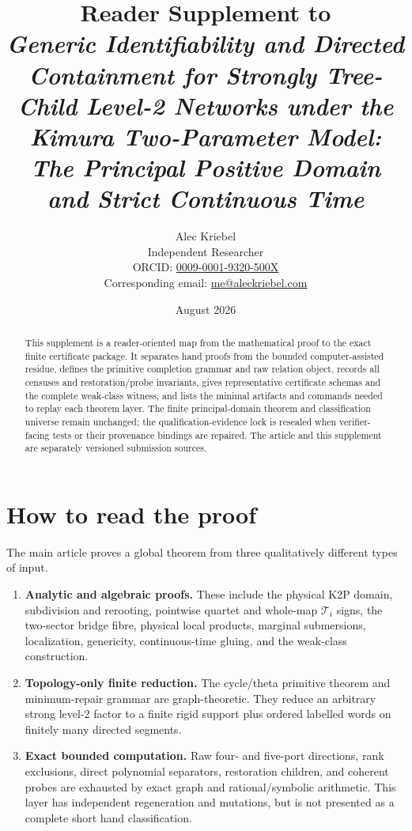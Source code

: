 \documentclass[11pt]{article}
\title{Reader Supplement to\\
\emph{Generic Identifiability and Directed Containment for Strongly
Tree-Child Level-2 Networks under the Kimura Two-Parameter Model:\\
The Principal Positive Domain and Strict Continuous Time}}
\author{Alec Kriebel\\
\small Independent Researcher\\
\small ORCID: \href{https://orcid.org/0009-0001-9320-500X}
{0009-0001-9320-500X}\\
\small Corresponding email: \href{mailto:me@aleckriebel.com}
{me@aleckriebel.com}}
\date{August 2026}
\theoremstyle{remark}
\begin{document}
\maketitle

\begin{abstract}
This supplement is a reader-oriented map from the mathematical proof to the
exact finite certificate package.  It separates hand proofs from the bounded
computer-assisted residue, defines the primitive completion grammar and raw
relation object, records all censuses and restoration/probe invariants, gives
representative certificate schemas and the complete weak-class witness, and
lists the minimal artifacts and commands needed to replay each theorem layer.
The finite principal-domain theorem and classification universe remain
unchanged; the qualification-evidence lock is resealed when verifier-facing
tests or their provenance bindings are repaired.  The article and this
supplement are separately versioned submission sources.
\end{abstract}

\tableofcontents

\section{How to read the proof}\label{sec:guide}

The main article proves a global theorem from three qualitatively different
types of input.

\begin{enumerate}[label=\textbf{P\arabic*.}]
  \item \textbf{Analytic and algebraic proofs.}  These include the physical
        K2P domain, subdivision and rerooting, pointwise quartet and
        whole-map \(\mathcal T_i\) signs, the two-sector bridge fibre, physical local
        products, marginal submersions, localization, genericity,
        continuous-time gluing, and the weak-class construction.
  \item \textbf{Topology-only finite reduction.}  The cycle/theta primitive
        theorem and minimum-repair grammar are graph-theoretic.  They reduce
        an arbitrary strong level-2 factor to a finite rigid support plus
        ordered labelled words on finitely many directed segments.
  \item \textbf{Exact bounded computation.}  Raw four- and five-port
        directions, rank exclusions, direct polynomial separators,
        restoration children, and coherent probes are exhausted by exact
        graph and rational/symbolic arithmetic.  This layer has independent
        regeneration and mutations, but is not presented as a complete short
        hand classification.
\end{enumerate}
\end{document}
